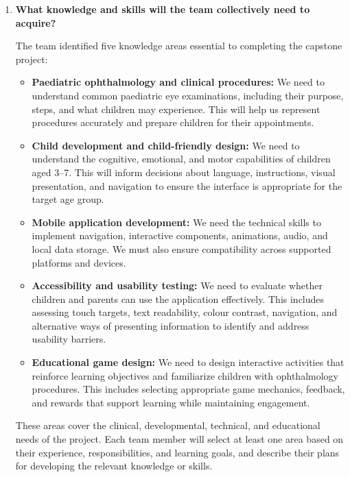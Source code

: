 \documentclass[12pt]{article}
\begin{document}
\begin{enumerate}
    \item \textbf{What knowledge and skills will the team collectively
    need to acquire?}

    The team identified five knowledge areas essential to completing
    the capstone project:

    \begin{itemize}
        \item \textbf{Paediatric ophthalmology and clinical procedures:}
        We need to understand common paediatric eye examinations,
        including their purpose, steps, and what children may experience.
        This will help us represent procedures accurately and prepare
        children for their appointments.

        \item \textbf{Child development and child-friendly design:}
        We need to understand the cognitive, emotional, and motor
        capabilities of children aged 3--7. This will inform decisions
        about language, instructions, visual presentation, and navigation
        to ensure the interface is appropriate for the target age group.

        \item \textbf{Mobile application development:}
        We need the technical skills to implement navigation,
        interactive components, animations, audio, and local data
        storage. We must also ensure compatibility across supported
        platforms and devices.

        \item \textbf{Accessibility and usability testing:}
        We need to evaluate whether children and parents can use the
        application effectively. This includes assessing touch targets,
        text readability, colour contrast, navigation, and alternative
        ways of presenting information to identify and address usability
        barriers.

        \item \textbf{Educational game design:}
        We need to design interactive activities that reinforce learning
        objectives and familiarize children with ophthalmology procedures.
        This includes selecting appropriate game mechanics, feedback,
        and rewards that support learning while maintaining engagement.
    \end{itemize}

    These areas cover the clinical, developmental, technical, and
    educational needs of the project. Each team member will select
    at least one area based on their experience, responsibilities,
    and learning goals, and describe their plans for developing
    the relevant knowledge or skills.


\end{enumerate}
\end{document}

